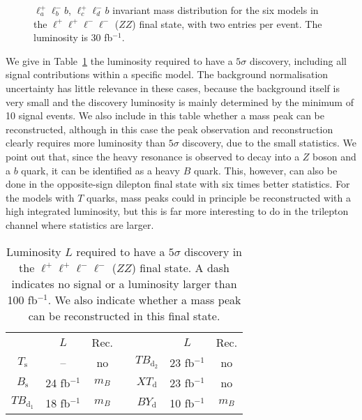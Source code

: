 \documentclass[12pt,a4paper]{article}
\newcommand{\fbin}{fb$^{-1}$}
\newcommand{\Ts}{T_\text{s}}
\newcommand{\Bs}{B_\text{s}}
\newcommand{\TBd}{TB_{\text{d}_1}}
\newcommand{\TBD}{TB_{\text{d}_2}}
\newcommand{\XTd}{XT_\text{d}}
\newcommand{\BYd}{BY_\text{d}}
\begin{document}
\begin{figure}[ht]
\begin{center}
\caption{$\ell_a^+ \ell_b^- b$, $\ell_c^+ \ell_d^- b$ invariant mass distribution for the six models in the $\ell^+ \ell^+ \ell^- \ell^-$ ($ZZ$) final state, with two entries per event. The luminosity is 30 fb$^{-1}$.}
\label{fig:mrec-4Q0-ZZ}
\end{center}
\end{figure}

We give in Table~\ref{tab:sig-4Q0-ZZ} the luminosity required to have a $5\sigma$ discovery,
including all signal contributions within a specific model. The background normalisation uncertainty has little relevance in these cases, because the background itself is very small and the discovery luminosity is mainly determined by the minimum of 10 signal events.
We also include in this table whether a mass peak can be reconstructed, although in this case the peak observation and reconstruction clearly requires more luminosity than $5\sigma$ discovery, due to the small statistics. We point out that, since the heavy resonance is observed to decay into a $Z$ boson and a $b$ quark, it can be identified as a heavy $B$ quark. This, however, can also be done in the opposite-sign dilepton final state with six times better statistics.
For the models with $T$ quarks, mass peaks could in principle be reconstructed with a high integrated luminosity, but this is far more interesting to do in the trilepton channel where statistics are larger.

\begin{table}[ht]
\begin{center}
\begin{tabular}{ccccccc}
       & $L$      & Rec.  & \quad  &        & $L$       & Rec.  \\[1mm]
$\Ts$  & --       & no    &        & $\TBD$ & 23 \fbin  & no    \\
$\Bs$  & 24 \fbin & $m_B$ &        & $\XTd$ & 23 \fbin  & no    \\
$\TBd$ & 18 \fbin & $m_B$ &        & $\BYd$ & 10 \fbin  & $m_B$
\end{tabular}
\end{center}
\caption{Luminosity $L$ required to have a $5\sigma$ discovery in the $\ell^+ \ell^+ \ell^- \ell^-$ ($ZZ$) final state.  A dash indicates no signal or a luminosity larger than 100 \fbin. We also indicate whether a mass peak can be reconstructed in this final state.}
\label{tab:sig-4Q0-ZZ}
\end{table}
\end{document}
